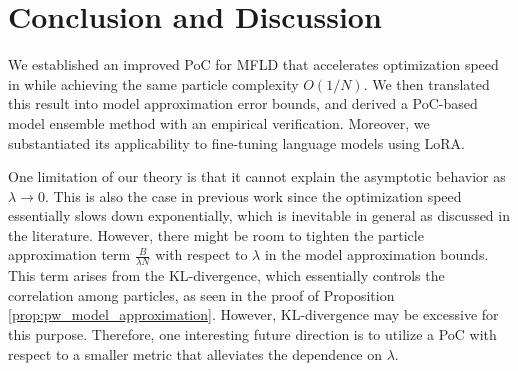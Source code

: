 \section*{Conclusion and Discussion}
We established an improved PoC for MFLD that accelerates optimization speed in \citet{nitanda2024improved,chewi2024uniform} while achieving the same particle complexity $O(1/N)$. We then translated this result into model approximation error bounds, and derived a PoC-based model ensemble method with an empirical verification. Moreover, we substantiated its applicability to fine-tuning language models using LoRA.

One limitation of our theory is that it cannot explain the asymptotic behavior as $\lambda \to 0$. This is also the case in previous work since the optimization speed essentially slows down exponentially, which is inevitable in general as discussed in the literature. However, there might be room to tighten the particle approximation term $\frac{B}{\lambda N}$ with respect to $\lambda$ in the model approximation bounds. This term arises from the KL-divergence, which essentially controls the correlation among particles, as seen in the proof of Proposition \ref{prop:pw_model_approximation}. However, KL-divergence may be excessive for this purpose. Therefore, one interesting future direction is to utilize a PoC with respect to a smaller metric that alleviates the dependence on $\lambda$.